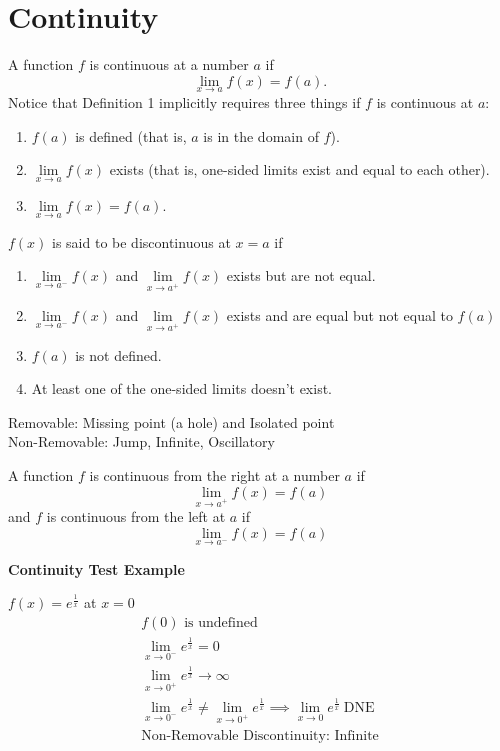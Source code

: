 \documentclass{article}
\newcommand{\theorem}[2]{\begin{tcolorbox}[title={#1},colback=blue!5!white,colframe=blue!75!black,parbox=false] #2 \end{tcolorbox}}
\begin{document}
\section{Continuity}
\theorem{Continuity at a number:}{
A function $f$ is continuous at a number $a$ if
$$\lim_{x\rightarrow a}f(x)=f(a).$$
Notice that Definition 1 implicitly requires three things if $f$ is continuous at $a$:
\begin{enumerate}
    \item $f(a)$ is defined (that is, $a$ is in the domain of $f$).
    \item $\lim\limits_{x\rightarrow a}f(x)$ exists (that is, one-sided limits exist and equal to each other).
    \item $\lim\limits_{x\rightarrow a}f(x)=f(a)$.
\end{enumerate}
}

\theorem{Discontinuity:}{
$f(x)$ is said to be discontinuous at $x=a$ if
\begin{enumerate}
    \item $\lim\limits_{x\rightarrow a^{-}}f(x)$ and $\lim\limits_{x\rightarrow a^{+}}f(x)$ exists but are not equal.
    \item $\lim\limits_{x\rightarrow a^{-}}f(x)$ and $\lim\limits_{x\rightarrow a^{+}}f(x)$ exists and are equal but not equal to $f(a)$
    \item $f(a)$ is not defined.
    \item At least one of the one-sided limits doesn't exist.
\end{enumerate}
}

\theorem{Types of Discontinuity}{
Removable: Missing point (a hole) and Isolated point \\
Non-Removable: Jump, Infinite, Oscillatory
}

\theorem{Directional Continuity:}{
A function $f$ is continuous from the right at a number $a$ if
$$\lim_{x\rightarrow a^{+}}f(x)=f(a)$$
and $f$ is continuous from the left at $a$ if 
$$\lim_{x\to a^{-}}f(x)=f(a)$$
}

\textbf{Continuity Test Example}

$f(x)=e^\frac{1}{x}$ at $x=0$
\begin{gather*}
    f(0) \text{ is undefined}\\
    \lim_{x\to 0^-}e^\frac{1}{x}=0\\
    \lim_{x\to 0^+}e^\frac{1}{x}\to \infty\\
    \lim_{x\to 0^-}e^\frac{1}{x} \ne \lim_{x\to 0^+}e^\frac{1}{x} \implies \lim_{x\to0}e^\frac{1}{x} \ \mathrm{DNE}\\
    \boxed{\text{Non-Removable Discontinuity: Infinite}}
\end{gather*}
\end{document}
